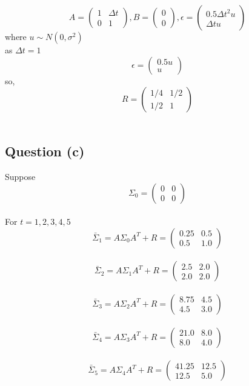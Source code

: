 \documentclass{article}
\begin{document}
$$A = \begin{pmatrix}
1 & \Delta t\\
0 & 1 
\end{pmatrix}, 
B = 
\begin{pmatrix}
0 \\
0
\end{pmatrix}, 
\epsilon = 
\begin{pmatrix}
0.5{\Delta t}^2 u\\
\Delta t u
\end{pmatrix}
$$ where $u\sim{N(0, \sigma^2)}$\\
as $\Delta t = 1$\\
$$
\epsilon = 
\begin{pmatrix}
0.5u\\
u
\end{pmatrix}
$$
so,
$$
R = 
\begin{pmatrix}
1/4 & 1/2\\
1/2 & 1
\end{pmatrix}
$$\\




\subsection{Question (c)}
Suppose $$ 
\Sigma_0 = 
\begin{pmatrix}
0&0\\0&0
\end{pmatrix}
$$\\ 
For $t = 1, 2, 3, 4, 5$\\
$$ 
\bar{\Sigma}_1 = A\Sigma_0A^{T}+R=\begin{pmatrix}
0.25 & 0.5 \\
0.5  & 1.0
\end{pmatrix}
$$\\
$$ 
\bar{\Sigma}_2 = A\Sigma_1A^{T}+R=\begin{pmatrix}
2.5 & 2.0 \\
2.0  & 2.0
\end{pmatrix}
$$\\
$$ 
\bar{\Sigma}_3 = A\Sigma_2A^{T}+R=\begin{pmatrix}
8.75 & 4.5 \\
4.5  & 3.0
\end{pmatrix}
$$\\
$$ 
\bar{\Sigma}_4 = A\Sigma_3A^{T}+R=\begin{pmatrix}
21.0 & 8.0 \\
8.0  & 4.0
\end{pmatrix}
$$\\
$$ 
\bar{\Sigma}_5 = A\Sigma_4A^{T}+R=\begin{pmatrix}
41.25 & 12.5 \\
12.5  & 5.0
\end{pmatrix}
$$\\
\end{document}
